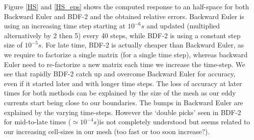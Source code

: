 \documentclass[twoside]{article}
\begin{document}
Figure \ref{HS} and \ref{HS_eps} shows the computed response to an half-space for both Backward Euler and BDF-2 and the obtained relative errors. Backward Euler is using an increasing time step starting at $10^{-6}s$ and updated (multiplied alternatively by 2 then 5) every 40 steps, while BDF-2 is using a constant step size of $10^{-5}s$. For late time, BDF-2 is actually cheaper than Backward Euler, as we require to factorize a single matrix (for a single time step), whereas backward Euler need to re-factorize a new matrix each time we increase the time-step. We see that rapidly BDF-2 catch up and overcome Backward Euler for accuracy, even if it started later and with longer time steps. The loss of accuracy at later times for both methods can be explained by the size of the mesh as our eddy currents start being close to our boundaries. The bumps in Backward Euler are explained by the varying time-steps. However the `double picks' seen in BDF-2 for mid-to-late times ($\simeq 10^{-4}s$)is not completely understood but seems related to our increasing cell-sizes in our mesh (too fast or too soon increase?).
\end{document}
